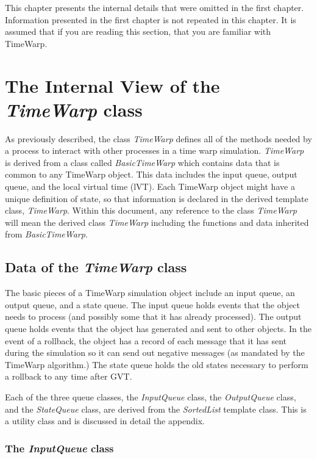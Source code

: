 \documentclass[11pt]{report}
\begin{document}
This chapter presents the internal details that were omitted in the
first chapter.  Information presented in the first chapter is not
repeated in this chapter.  It is assumed that if you are reading this
section, that you are familiar with TimeWarp.

\section{The Internal View of the {\it TimeWarp} class}

As previously described, the class {\it TimeWarp} defines all of the
methods needed by a process to interact with other processes in a time
warp simulation.  {\it TimeWarp} is derived from a class called {\it
BasicTimeWarp} which contains data that is common to any TimeWarp object.
This data includes the input queue, output queue, and the local virtual
time (lVT).  Each TimeWarp object might have a unique definition of
state, so that information is declared in the derived template class, {\it
TimeWarp}.  Within this document, any reference to the class {\it
TimeWarp} will mean the derived class {\it TimeWarp} including the
functions and data inherited from {\it BasicTimeWarp}.

\subsection{Data of the {\it TimeWarp} class}

The basic pieces of a TimeWarp simulation object include an input queue,
an output queue, and a state queue.  The input queue holds events that the
object needs to process (and possibly some that it has already processed).
The output queue holds events that the object has generated and sent to
other objects.  In the event of a rollback, the object has a record of
each message that it has sent during the simulation so it can send out
negative messages (as mandated by the TimeWarp algorithm.) The state
queue holds the old states necessary to perform a rollback to any time
after GVT.

Each of the three queue classes, the {\it InputQueue} class, the {\it
OutputQueue} class, and the {\it StateQueue} class, are derived from the
{\it SortedList} template class.  This is a utility class and is discussed
in detail the appendix.

\subsubsection{The {\it InputQueue} class}
\end{document}
